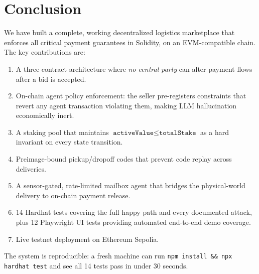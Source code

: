 \documentclass[12pt,a4paper]{article}
\begin{document}
\section{Conclusion}

We have built a complete, working decentralized logistics marketplace that enforces all critical payment guarantees in Solidity, on an EVM-compatible chain. The key contributions are:

\begin{enumerate}
    \item A three-contract architecture where \emph{no central party} can alter payment flows after a bid is accepted.
    \item On-chain agent policy enforcement: the seller pre-registers constraints that revert any agent transaction violating them, making LLM hallucination economically inert.
    \item A staking pool that maintains $\texttt{activeValue} \leq \texttt{totalStake}$ as a hard invariant on every state transition.
    \item Preimage-bound pickup/dropoff codes that prevent code replay across deliveries.
    \item A sensor-gated, rate-limited mailbox agent that bridges the physical-world delivery to on-chain payment release.
    \item 14 Hardhat tests covering the full happy path and every documented attack, plus 12 Playwright UI tests providing automated end-to-end demo coverage.
    \item Live testnet deployment on Ethereum Sepolia.
\end{enumerate}

The system is reproducible: a fresh machine can run \texttt{npm install \&\& npx hardhat test} and see all 14 tests pass in under 30 seconds.
\end{document}
